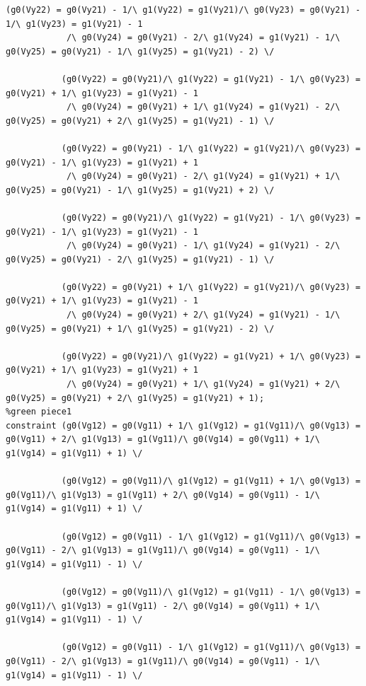 \begin{appendices}
\begin{lstlisting}[language=minizinc]
           (g0(Vy22) = g0(Vy21) - 1/\ g1(Vy22) = g1(Vy21)/\ g0(Vy23) = g0(Vy21) - 1/\ g1(Vy23) = g1(Vy21) - 1
            /\ g0(Vy24) = g0(Vy21) - 2/\ g1(Vy24) = g1(Vy21) - 1/\ g0(Vy25) = g0(Vy21) - 1/\ g1(Vy25) = g1(Vy21) - 2) \/
            
           (g0(Vy22) = g0(Vy21)/\ g1(Vy22) = g1(Vy21) - 1/\ g0(Vy23) = g0(Vy21) + 1/\ g1(Vy23) = g1(Vy21) - 1
            /\ g0(Vy24) = g0(Vy21) + 1/\ g1(Vy24) = g1(Vy21) - 2/\ g0(Vy25) = g0(Vy21) + 2/\ g1(Vy25) = g1(Vy21) - 1) \/
            
           (g0(Vy22) = g0(Vy21) - 1/\ g1(Vy22) = g1(Vy21)/\ g0(Vy23) = g0(Vy21) - 1/\ g1(Vy23) = g1(Vy21) + 1
            /\ g0(Vy24) = g0(Vy21) - 2/\ g1(Vy24) = g1(Vy21) + 1/\ g0(Vy25) = g0(Vy21) - 1/\ g1(Vy25) = g1(Vy21) + 2) \/
            
           (g0(Vy22) = g0(Vy21)/\ g1(Vy22) = g1(Vy21) - 1/\ g0(Vy23) = g0(Vy21) - 1/\ g1(Vy23) = g1(Vy21) - 1
            /\ g0(Vy24) = g0(Vy21) - 1/\ g1(Vy24) = g1(Vy21) - 2/\ g0(Vy25) = g0(Vy21) - 2/\ g1(Vy25) = g1(Vy21) - 1) \/
            
           (g0(Vy22) = g0(Vy21) + 1/\ g1(Vy22) = g1(Vy21)/\ g0(Vy23) = g0(Vy21) + 1/\ g1(Vy23) = g1(Vy21) - 1
            /\ g0(Vy24) = g0(Vy21) + 2/\ g1(Vy24) = g1(Vy21) - 1/\ g0(Vy25) = g0(Vy21) + 1/\ g1(Vy25) = g1(Vy21) - 2) \/
            
           (g0(Vy22) = g0(Vy21)/\ g1(Vy22) = g1(Vy21) + 1/\ g0(Vy23) = g0(Vy21) + 1/\ g1(Vy23) = g1(Vy21) + 1
            /\ g0(Vy24) = g0(Vy21) + 1/\ g1(Vy24) = g1(Vy21) + 2/\ g0(Vy25) = g0(Vy21) + 2/\ g1(Vy25) = g1(Vy21) + 1);
%green piece1            
constraint (g0(Vg12) = g0(Vg11) + 1/\ g1(Vg12) = g1(Vg11)/\ g0(Vg13) = g0(Vg11) + 2/\ g1(Vg13) = g1(Vg11)/\ g0(Vg14) = g0(Vg11) + 1/\ g1(Vg14) = g1(Vg11) + 1) \/
            
           (g0(Vg12) = g0(Vg11)/\ g1(Vg12) = g1(Vg11) + 1/\ g0(Vg13) = g0(Vg11)/\ g1(Vg13) = g1(Vg11) + 2/\ g0(Vg14) = g0(Vg11) - 1/\ g1(Vg14) = g1(Vg11) + 1) \/
            
           (g0(Vg12) = g0(Vg11) - 1/\ g1(Vg12) = g1(Vg11)/\ g0(Vg13) = g0(Vg11) - 2/\ g1(Vg13) = g1(Vg11)/\ g0(Vg14) = g0(Vg11) - 1/\ g1(Vg14) = g1(Vg11) - 1) \/
            
           (g0(Vg12) = g0(Vg11)/\ g1(Vg12) = g1(Vg11) - 1/\ g0(Vg13) = g0(Vg11)/\ g1(Vg13) = g1(Vg11) - 2/\ g0(Vg14) = g0(Vg11) + 1/\ g1(Vg14) = g1(Vg11) - 1) \/
            
           (g0(Vg12) = g0(Vg11) - 1/\ g1(Vg12) = g1(Vg11)/\ g0(Vg13) = g0(Vg11) - 2/\ g1(Vg13) = g1(Vg11)/\ g0(Vg14) = g0(Vg11) - 1/\ g1(Vg14) = g1(Vg11) - 1) \/
            

\end{lstlisting}
\end{appendices}
